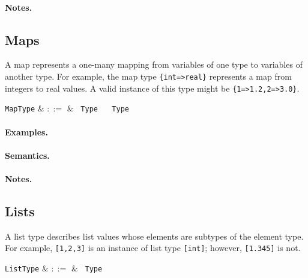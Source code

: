 \paragraph{Notes.} 


\subsection{Maps}

A map represents a one-many mapping from variables of one type to variables of another type. For example, the map type \lstinline|{int=>real}| represents a map from integers to real values. A valid instance of this type might be \lstinline|{1=>1.2,2=>3.0}|.

\begin{syntax}
  \verb+MapType+ & $::=$ & \token{\{} \ \verb+Type+ \ \token{=>} \ \verb+Type+ \ \token{\}} \\
\end{syntax}

\paragraph{Examples.}

\paragraph{Semantics.}

\paragraph{Notes.} 


\subsection{Lists}

A list type describes list values whose elements are subtypes of the element type. For example, \lstinline{[1,2,3]} is an instance of list type \lstinline{[int]}; however, \lstinline{[1.345]} is not.

\begin{syntax}
  \verb+ListType+ & $::=$ & \token{[} \ \verb+Type+ \ \token{]}\\
\end{syntax}

